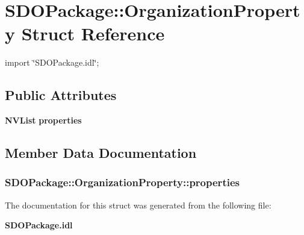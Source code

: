 \section{SDOPackage::OrganizationProperty Struct Reference}
\label{structSDOPackage_1_1OrganizationProperty}


{\ttfamily import \char`\"{}SDOPackage.idl\char`\"{};}

\subsection*{Public Attributes}
\begin{DoxyCompactItemize}
\item 
{\bf NVList} {\bf properties}
\end{DoxyCompactItemize}


\subsection{Member Data Documentation}
\subsubsection[{properties}]{ {\bf SDOPackage::OrganizationProperty::properties}}\label{structSDOPackage_1_1OrganizationProperty_a7ffebfa961644064d0051782634c2554}


The documentation for this struct was generated from the following file:\begin{DoxyCompactItemize}
\item 
{\bf SDOPackage.idl}\end{DoxyCompactItemize}

